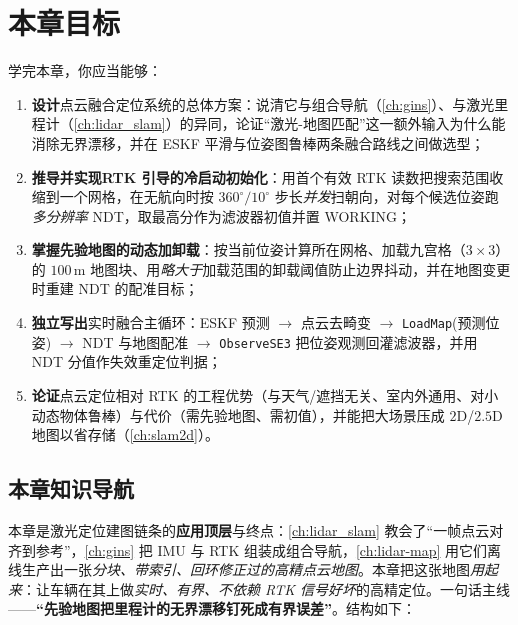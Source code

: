 \section*{本章目标}
学完本章，你应当能够：
\begin{enumerate}
  \item \textbf{设计}点云融合定位系统的总体方案：说清它与组合导航（\cref{ch:gins}）、与激光里程计（\cref{ch:lidar_slam}）的异同，论证“激光-地图匹配”这一额外输入为什么能消除无界漂移，并在 ESKF 平滑与位姿图鲁棒两条融合路线之间做选型；
  \item \textbf{推导并实现}\textbf{RTK 引导的冷启动初始化}：用首个有效 RTK 读数把搜索范围收缩到一个网格，在无航向时按 $360^\circ/10^\circ$ 步长\emph{并发}扫朝向，对每个候选位姿跑\emph{多分辨率} NDT，取最高分作为滤波器初值并置 \textsf{WORKING}；
  \item \textbf{掌握}\textbf{先验地图的动态加卸载}：按当前位姿计算所在网格、加载九宫格（$3\times3$）的 $100$\,m 地图块、用\emph{略大于}加载范围的卸载阈值防止边界抖动，并在地图变更时重建 NDT 的配准目标；
  \item \textbf{独立写出}实时融合主循环：ESKF 预测 $\to$ 点云去畸变 $\to$ \texttt{LoadMap}(预测位姿) $\to$ NDT 与地图配准 $\to$ \texttt{ObserveSE3} 把位姿观测回灌滤波器，并用 NDT 分值作失效重定位判据；
  \item \textbf{论证}点云定位相对 RTK 的工程优势（与天气/遮挡无关、室内外通用、对小动态物体鲁棒）与代价（需先验地图、需初值），并能把大场景压成 $2$D/$2.5$D 地图以省存储（\cref{ch:slam2d}）。
\end{enumerate}

\subsection*{本章知识导航}
本章是激光定位建图链条的\textbf{应用顶层}与终点：\cref{ch:lidar_slam} 教会了“一帧点云对齐到参考”，\cref{ch:gins} 把 IMU 与 RTK 组装成组合导航，\cref{ch:lidar-map} 用它们离线生产出一张\emph{分块、带索引、回环修正过的高精点云地图}。本章把这张地图\emph{用起来}：让车辆在其上做\emph{实时、有界、不依赖 RTK 信号好坏}的高精定位。一句话主线——\textbf{“先验地图把里程计的无界漂移钉死成有界误差”}。结构如下：

